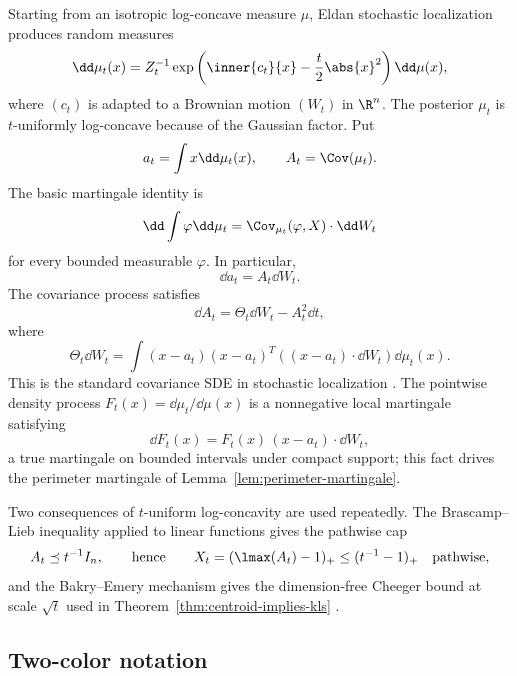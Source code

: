 \documentclass[../../main.tex]{subfiles}
\begin{document}
Starting from an isotropic log-concave measure $\mu$, Eldan stochastic localization produces random
measures
\begin{equation}\label{eq:loc-density}
  \dd\mu_t(x)=Z_t^{-1}\exp\left(\inner{c_t}{x}-\frac t2\abs{x}^2\right)\dd\mu(x),
\end{equation}
where $(c_t)$ is adapted to a Brownian motion $(W_t)$ in $\R^n$. The posterior $\mu_t$ is
$t$-uniformly log-concave because of the Gaussian factor. Put
\[
  a_t=\int x\dd\mu_t(x),\qquad A_t=\Cov(\mu_t).
\]
The basic martingale identity is
\begin{equation}\label{eq:loc-martingale}
  \dd\int\varphi\dd\mu_t
  =\Cov_{\mu_t}(\varphi,X)\cdot\dd W_t
\end{equation}
for every bounded measurable $\varphi$. In particular,
\begin{equation}\label{eq:mean-sde}
  \dd a_t=A_t\dd W_t .
\end{equation}
The covariance process satisfies
\begin{equation}\label{eq:cov-sde}
  \dd A_t=\Theta_t\dd W_t-A_t^2\dd t,
\end{equation}
where
\[
  \Theta_t\dd W_t
  =\int (x-a_t)(x-a_t)^T((x-a_t)\cdot\dd W_t)\dd\mu_t(x).
\]
This is the standard covariance SDE in stochastic localization \cite{Eldan2013ThinShell,LeeVempala2024}.
The pointwise density process $F_t(x)=\dd\mu_t/\dd\mu(x)$ is a nonnegative local martingale
satisfying
\begin{equation}\label{eq:density-sde}
  \dd F_t(x)=F_t(x)\,(x-a_t)\cdot\dd W_t ,
\end{equation}
a true martingale on bounded intervals under compact support; this fact drives the perimeter
martingale of Lemma~\ref{lem:perimeter-martingale}.

Two consequences of $t$-uniform log-concavity are used repeatedly. The Brascamp--Lieb inequality
applied to linear functions gives the pathwise cap
\begin{equation}\label{eq:BL-cap}
  A_t\preceq t^{-1}I_n,
  \qquad\text{hence}\qquad
  X_t=(\lmax(A_t)-1)_+\le(t^{-1}-1)_+\quad\text{pathwise},
\end{equation}
and the Bakry--Emery mechanism gives the dimension-free Cheeger bound at scale $\sqrt t$ used in
Theorem~\ref{thm:centroid-implies-kls} \cite{BrascampLieb1976,BakryGentilLedoux2014}.

\subsection{Two-color notation}
\end{document}
